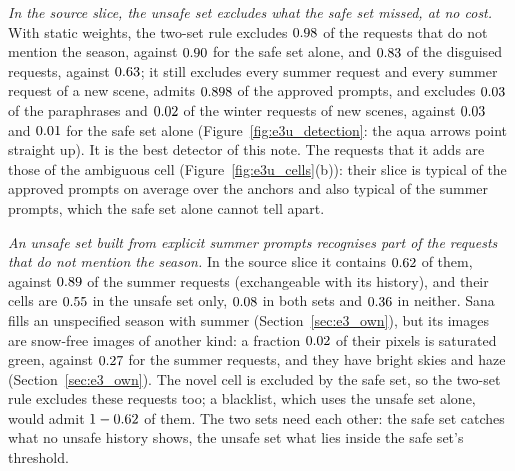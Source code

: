 \documentclass{article}
\theoremstyle{plain}
\theoremstyle{remark}
\begin{document}
\emph{In the source slice, the unsafe set excludes what the safe set missed, at no cost.} With static weights, the two-set rule excludes
$0.98$ of the requests that do not mention the season, against $0.90$ for the safe set alone, and $0.83$ of
the disguised requests, against $0.63$; it still excludes every summer request and every summer request of a new scene, admits
$0.898$ of the approved prompts, and excludes $0.03$ of the paraphrases and $0.02$ of the winter requests of new
scenes, against $0.03$ and $0.01$ for the safe set alone (Figure~\ref{fig:e3u_detection}: the aqua arrows point
straight up). It is the best detector of this
note. The requests that it adds are those of the ambiguous cell (Figure~\ref{fig:e3u_cells}(b)): their slice is typical of the approved
prompts on average over the anchors and also typical of the summer prompts, which the safe set alone cannot tell apart.

\emph{An unsafe set built from explicit summer prompts recognises part of the requests that do not mention the season.} In the source
slice it contains $0.62$ of them, against $0.89$ of the summer requests (exchangeable with its history), and their cells
are $0.55$ in the unsafe set only, $0.08$ in both sets and $0.36$ in neither. Sana fills an
unspecified season with summer (Section~\ref{sec:e3_own}), but its images are snow-free images of another kind: a fraction $0.02$ of their pixels is saturated green,
against $0.27$ for the summer requests, and they have bright skies and haze (Section~\ref{sec:e3_own}). The novel cell is excluded by the safe set, so the two-set rule excludes these
requests too; a blacklist, which uses the unsafe set alone, would admit $1-0.62$ of them. The two sets need each other: the
safe set catches what no unsafe history shows, the unsafe set what lies inside the safe set's threshold.
\end{document}

